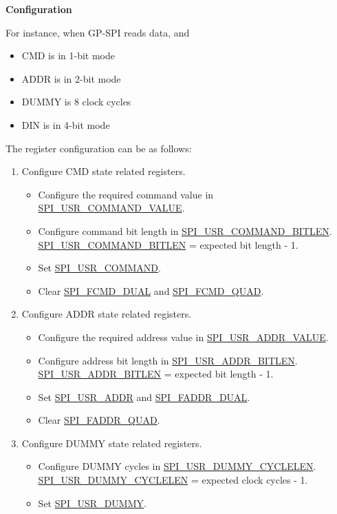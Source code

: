 \documentclass[main\_\_EN.tex]{subfiles}
\begin{document}
\textbf{Configuration}

For instance, when GP-SPI reads data, and
\begin{itemize}
    \item CMD is in 1-bit mode
    \item ADDR is in 2-bit mode
    \item DUMMY is 8 clock cycles
    \item DIN is in 4-bit mode
\end{itemize}
The register configuration can be as follows:

\begin{enumerate}
    \item Configure CMD state related registers.
        \begin{itemize}
            \item Configure the required command value in \hyperref[fielddesc:SPIUSRCOMMANDVALUE]{SPI\_USR\_COMMAND\_VALUE}.
            \item Configure command bit length in \hyperref[fielddesc:SPIUSRCOMMANDBITLEN]{SPI\_USR\_COMMAND\_BITLEN}. \hyperref[fielddesc:SPIUSRCOMMANDBITLEN]{SPI\_USR\_COMMAND\_BITLEN} = expected bit length - 1.
            \item Set \hyperref[fielddesc:SPIUSRCOMMAND]{SPI\_USR\_COMMAND}.
            \item Clear \hyperref[fielddesc:SPIFCMDDUAL]{SPI\_FCMD\_DUAL} and \hyperref[fielddesc:SPIFCMDQUAD]{SPI\_FCMD\_QUAD}.
        \end{itemize}

    \item Configure ADDR state related registers.
        \begin{itemize}
            \item Configure the required address value in \hyperref[fielddesc:SPIUSRADDRVALUE]{SPI\_USR\_ADDR\_VALUE}.
            \item Configure address bit length in \hyperref[fielddesc:SPIUSRADDRBITLEN]{SPI\_USR\_ADDR\_BITLEN}. \hyperref[fielddesc:SPIUSRADDRBITLEN]{SPI\_USR\_ADDR\_BITLEN} = expected bit length - 1.
            \item Set \hyperref[fielddesc:SPIUSRADDR]{SPI\_USR\_ADDR} and \hyperref[fielddesc:SPIFADDRDUAL]{SPI\_FADDR\_DUAL}.
            \item Clear \hyperref[fielddesc:SPIFADDRQUAD]{SPI\_FADDR\_QUAD}.
        \end{itemize}

    \item Configure DUMMY state related registers.
        \begin{itemize}
            \item Configure DUMMY cycles in \hyperref[fielddesc:SPIUSRDUMMYCYCLELEN]{SPI\_USR\_DUMMY\_CYCLELEN}. \hyperref[fielddesc:SPIUSRDUMMYCYCLELEN]{SPI\_USR\_DUMMY\_CYCLELEN} = expected clock cycles - 1.
            \item Set \hyperref[fielddesc:SPIUSRDUMMY]{SPI\_USR\_DUMMY}.
        \end{itemize}


\end{enumerate}
\end{document}
